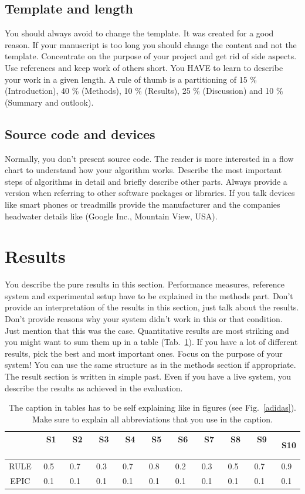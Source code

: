 \documentclass[conference]{IEEEtran}
\begin{document}
\subsection{Template and length}
You should always avoid to change the template. It was created for a good reason. If your manuscript is too long you should change the content and not the template. Concentrate on the purpose of your project and get rid of side aspects. Use references and keep work of others short. You HAVE to learn to describe your work in a given length. A rule of thumb is a partitioning of 15 \% (Introduction), 40 \% (Methods), 10 \% (Results), 25 \% (Discussion) and 10 \% (Summary and outlook).

\subsection{Source code and devices}
Normally, you don't present source code. The reader is more interested in a flow chart to understand how your algorithm works.  Describe the most important steps of algorithms in detail and briefly describe other parts. Always provide a version when referring to other software packages or libraries. 
If you talk devices like smart phones or treadmills provide the manufacturer and the companies headwater details like (Google Inc., Mountain View, USA). 

\section{Results}
You describe the pure results in this section. Performance measures, reference system and experimental setup have to be explained in the methods part. Don't provide an interpretation of the results in this section, just talk about the results. Don't provide reasons why your system didn't work in this or that condition. Just mention that this was the case. Quantitative results are most striking and you might want to sum them up in a table (Tab.~\ref{result_table}). If you have a lot of different results, pick the best and most important ones. Focus on the purpose of your system! You can use the same structure as in the methods section if appropriate.\\
The result section is written in simple past. Even if you have a live system, you describe the results as achieved in the evaluation. 

\begin{table}[!t]
\caption{The caption in tables has to be self explaining like in figures (see Fig.~\ref{adidas}). Make sure to explain all abbreviations that you use in the caption.}
\begin{center}
\begin{tabular}{c|cccccccccc}
& \ S1 \ &\ S2 \ &\ S3 \ & \ S4 \ & \ S5 \ & \ S6 \ & \ S7 \ & \ S8 \ & \ S9 \ & \ S10\\
\hline
RULE&0.5&0.7&0.3&0.7&0.8&0.2&0.3&0.5&0.7&0.9\\
EPIC&0.1&0.1&0.1&0.1&0.1&0.1&0.1&0.1&0.1&0.1\\
\end{tabular}
\label{result_table}
\end{center}
\end{table}
\end{document}
